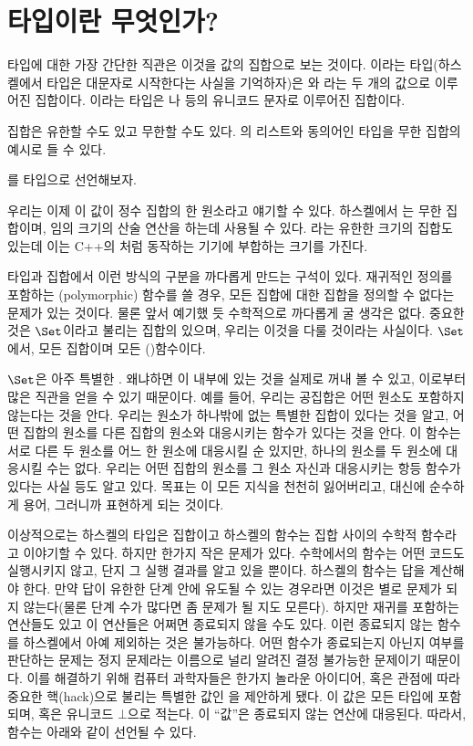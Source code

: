 \section{타입이란 무엇인가?}

타입에 대한 가장 간단한 직관은 이것을 값의 집합으로 보는 것이다.
이라는 타입(하스켈에서 타입은 대문자로 시작한다는 사실을 기억하자)은 와 라는 두 개의 값으로 이루어진 집합이다.
이라는 타입은 나  등의 유니코드 문자로 이루어진 집합이다.

집합은 유한할 수도 있고 무한할 수도 있다. 의 리스트와 동의어인  타입을 무한 집합의 예시로 들 수 있다.

를  타입으로 선언해보자.

우리는 이제 이 값이 정수 집합의 한 원소라고 얘기할 수 있다.
하스켈에서 는 무한 집합이며, 임의 크기의 산술 연산을 하는데 사용될 수 있다. 라는 유한한 크기의 집합도 있는데 이는 C++의 처럼 동작하는 기기에 부합하는 크기를 가진다.

타입과 집합에서 이런 방식의 구분을 까다롭게 만드는 구석이 있다.
재귀적인 정의를 포함하는 \trPolymorphic(polymorphic) 함수를 쓸 경우, 모든 집합에 대한 집합을 정의할 수 없다는 문제가 있는 것이다.
물론 앞서 예기했 듯 수학적으로 까다롭게 굴 생각은 없다. 중요한 것은 $\Set$이라고 불리는 집합의 \trCategory\가 있으며, 우리는 이것을 다룰 것이라는 사실이다.
$\Set$에서, 모든 \trObject\는 집합이며 모든 \trMorphism(\trArrow)\은 함수이다.

$\Set$은 아주 특별한 . 왜냐하면 이  \trObject 내부에 있는 것을 실제로 꺼내 볼 수 있고, 이로부터 많은 직관을 얻을 수 있기 때문이다.
예를 들어, 우리는 공집합은 어떤 원소도 포함하지 않는다는 것을 안다. 우리는 원소가 하나밖에 없는 특별한 집합이 있다는 것을 알고, 어떤 집합의 원소를 다른 집합의 원소와 대응시키는 함수가 있다는 것을 안다.
이 함수는 서로 다른 두 원소를 어느 한 원소에 대응시킬 순 있지만, 하나의 원소를 두 원소에 대응시킬 수는 없다.
우리는 어떤 집합의 원소를 그 원소 자신과 대응시키는 항등 함수가 있다는 사실 등도 알고 있다.
목표는 이 모든 지식을 천천히 잃어버리고, 대신에 순수하게  용어, 그러니까 \trObject\와 \trArrow\로 표현하게 되는 것이다.

이상적으로는 하스켈의 타입은 집합이고 하스켈의 함수는 집합 사이의 수학적 함수라고 이야기할 수 있다.
하지만 한가지 작은 문제가 있다. 수학에서의 함수는 어떤 코드도 실행시키지 않고, 단지 그 실행 결과를 알고 있을 뿐이다.
하스켈의 함수는 답을 계산해야 한다. 만약 답이 유한한 단계 안에 유도될 수 있는 경우라면 이것은 별로 문제가 되지 않는다(물론 단계 수가 많다면 좀 문제가 될 지도 모른다).
하지만 재귀를 포함하는 연산들도 있고 이 연산들은 어쩌면 종료되지 않을 수도 있다. 이런 종료되지 않는 함수를 하스켈에서 아예 제외하는 것은 불가능하다.
어떤 함수가 종료되는지 아닌지 여부를 판단하는 문제는 정지 문제라는 이름으로 널리 알려진 결정 불가능한 문제이기 때문이다.
이를 해결하기 위해 컴퓨터 과학자들은 한가지 놀라운 아이디어, 혹은 관점에 따라 중요한 핵(hack)으로 불리는 특별한 값인 \newterm{\trBottom}을 제안하게 됐다.
이 값은 모든 타입에 포함되며, \code{\_|\_} 혹은 유니코드 $\bot$으로 적는다. 이 ``값''은 종료되지 않는 연산에 대응된다. 따라서, 함수는 아래와 같이 선언될 수 있다.

